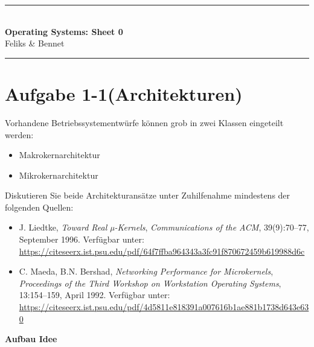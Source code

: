 \documentclass{article}
\newcommand{\sheetNR}{0}
\begin{document}
\hrule\medskip\rule{0ex}{0ex}\\[-1ex]\noindent\large
\textbf{Operating Systems: Sheet \sheetNR \space}\\[0.5ex]
\normalsize{Feliks \& Bennet}

\medskip\hrule\noindent\vskip 0.5cm


\section*{Aufgabe 1-1(Architekturen)}


\noindent
Vorhandene Betriebssystementwürfe können grob in zwei Klassen eingeteilt werden:
\begin{itemize}
    \item Makrokernarchitektur
    \item Mikrokernarchitektur
\end{itemize}

\noindent
Diskutieren Sie beide Architekturansätze unter Zuhilfenahme mindestens der folgenden Quellen:

\begin{itemize}
    \item J. Liedtke, \textit{Toward Real µ-Kernels}, \textit{Communications of the ACM}, 39(9):70--77, September 1996.  
    Verfügbar unter: \url{https://citeseerx.ist.psu.edu/pdf/64f7ffba964343a3fc91f870672459b619988d6c}
    \item C. Maeda, B.N. Bershad, \textit{Networking Performance for Microkernels}, \textit{Proceedings of the Third Workshop on Workstation Operating Systems}, 13:154--159, April 1992.  
    Verfügbar unter: \url{https://citeseerx.ist.psu.edu/pdf/4d5811e818391a007616b1ae881b1738d643e630}
\end{itemize}

\textbf{Aufbau Idee}


\end{document}

